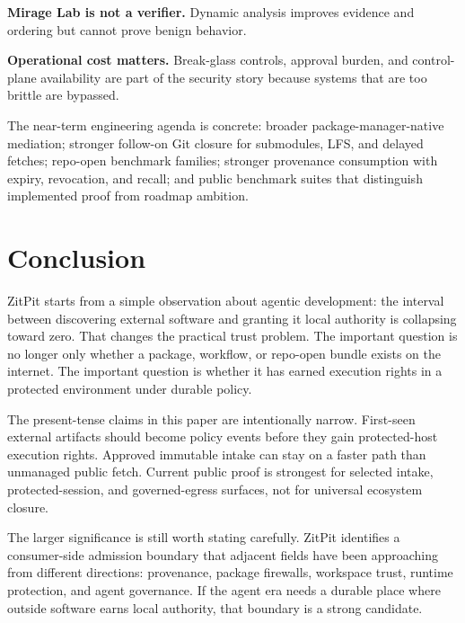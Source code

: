 \documentclass[conference]{IEEEtran}
\newcommand{\product}{ZitPit}
\begin{document}
\textbf{Mirage Lab is not a verifier.} Dynamic analysis improves evidence and ordering but cannot prove benign behavior.

\textbf{Operational cost matters.} Break-glass controls, approval burden, and control-plane availability are part of the security story because systems that are too brittle are bypassed.

The near-term engineering agenda is concrete: broader package-manager-native mediation; stronger follow-on Git closure for submodules, LFS, and delayed fetches; repo-open benchmark families; stronger provenance consumption with expiry, revocation, and recall; and public benchmark suites that distinguish implemented proof from roadmap ambition.

\section{Conclusion}

\product{} starts from a simple observation about agentic development: the interval between discovering external software and granting it local authority is collapsing toward zero. That changes the practical trust problem. The important question is no longer only whether a package, workflow, or repo-open bundle exists on the internet. The important question is whether it has earned execution rights in a protected environment under durable policy.

The present-tense claims in this paper are intentionally narrow. First-seen external artifacts should become policy events before they gain protected-host execution rights. Approved immutable intake can stay on a faster path than unmanaged public fetch. Current public proof is strongest for selected intake, protected-session, and governed-egress surfaces, not for universal ecosystem closure.

The larger significance is still worth stating carefully. \product{} identifies a consumer-side admission boundary that adjacent fields have been approaching from different directions: provenance, package firewalls, workspace trust, runtime protection, and agent governance. If the agent era needs a durable place where outside software earns local authority, that boundary is a strong candidate.

\balance


\end{document}
